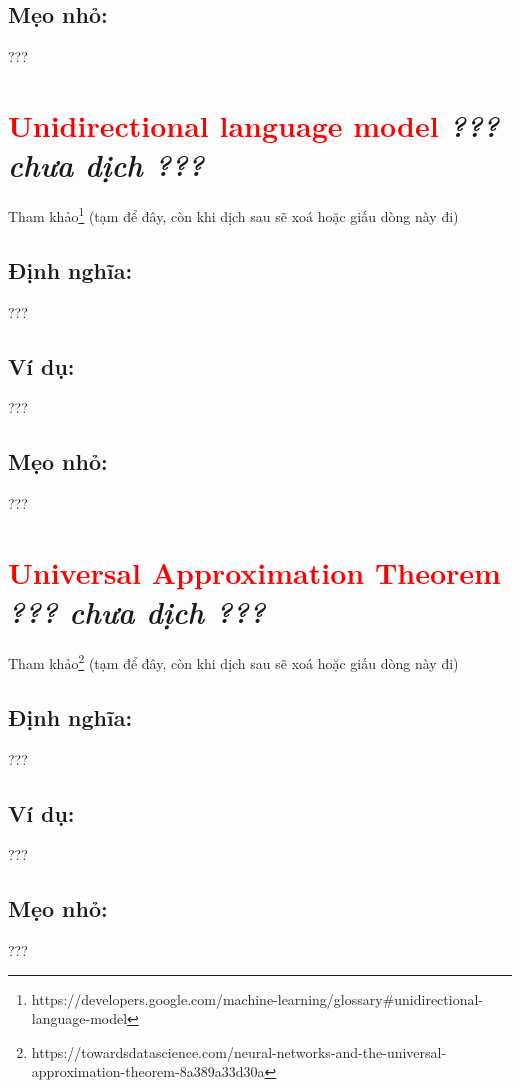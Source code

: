 \subsection*{Mẹo nhỏ:}
???
\section*{\huge \textcolor{Red}{Unidirectional language model}  \small \textit{??? chưa dịch ???} }
Tham khảo\footnote{https://developers.google.com/machine-learning/glossary\#unidirectional-language-model} (tạm để đây, còn khi dịch sau sẽ xoá hoặc giấu dòng này đi)
\subsection*{Định nghĩa:}
???
\subsection*{Ví dụ:}
???
\subsection*{Mẹo nhỏ:}
???
\section*{\huge \textcolor{Red}{Universal Approximation Theorem}  \small \textit{??? chưa dịch ???} }
Tham khảo\footnote{https://towardsdatascience.com/neural-networks-and-the-universal-approximation-theorem-8a389a33d30a} (tạm để đây, còn khi dịch sau sẽ xoá hoặc giấu dòng này đi)
\subsection*{Định nghĩa:}
???
\subsection*{Ví dụ:}
???
\subsection*{Mẹo nhỏ:}
???
